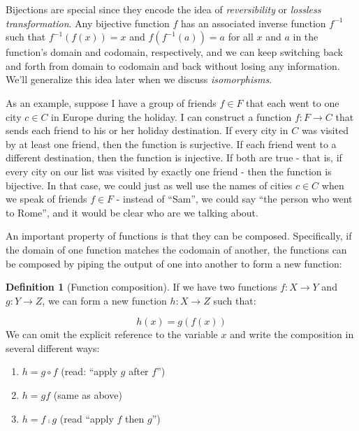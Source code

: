 \documentclass[
]{book}
\providecommand{\tightlist}{%
  \setlength{\itemsep}{0pt}\setlength{\parskip}{0pt}}
\theoremstyle{definition}
\newtheorem{definition}{Definition}[chapter]
\theoremstyle{definition}
\theoremstyle{definition}
\theoremstyle{definition}
\theoremstyle{remark}
\begin{document}
Bijections are special since they encode the idea of \emph{reversibility} or \emph{lossless transformation}. Any bijective function \(f\) has an associated inverse function \(f^{-1}\) such that \(f^{-1}(f(x)) = x\) and \(f(f^{-1}(a)) = a\) for all \(x\) and \(a\) in the function's domain and codomain, respectively, and we can keep switching back and forth from domain to codomain and back without losing any information. We'll generalize this idea later when we discuss \emph{isomorphisms}.

As an example, suppose I have a group of friends \(f \in F\) that each went to one city \(c \in C\) in Europe during the holiday. I can construct a function \(f: F \to C\) that sends each friend to his or her holiday destination. If every city in \(C\) was visited by at least one friend, then the function is surjective. If each friend went to a different destination, then the function is injective. If both are true - that is, if every city on our list was visited by exactly one friend - then the function is bijective. In that case, we could just as well use the names of cities \(c \in C\) when we speak of friends \(f \in F\) - instead of ``Sam'', we could say ``the person who went to Rome'', and it would be clear who are we talking about.

An important property of functions is that they can be composed. Specifically, if the domain of one function matches the codomain of another, the functions can be composed by piping the output of one into another to form a new function:

\begin{definition}[Function composition]

If we have two functions \(f: X \to Y\) and \(g: Y \to Z\), we can form a new function \(h: X \to Z\) such that:

\[h(x) = g(f(x))\]
We can omit the explicit reference to the variable \(x\) and write the composition in several different ways:

\begin{enumerate}
\def\labelenumi{\arabic{enumi}.}
\tightlist
\item
  \(h = g \circ f\) (read: ``apply \(g\) after \(f\)'')
\item
  \(h = gf\) (same as above)
\item
  \(h = f ⨾ g\) (read ``apply \(f\) then \(g\)'')
\end{enumerate}

\end{definition}
\end{document}
